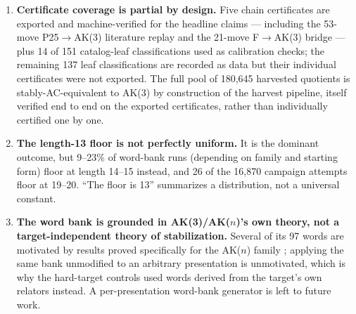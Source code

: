 \begin{enumerate}
  \item \textbf{Certificate coverage is partial by design.} Five chain certificates are
    exported and machine-verified for the headline claims --- including the 53-move
    P25$\to$AK(3) literature replay and the 21-move F$\to$AK(3) bridge --- plus 14 of 151
    catalog-leaf classifications used as calibration checks; the remaining 137 leaf
    classifications are recorded as data but their individual certificates were not
    exported. The full pool of 180,645 harvested quotients is stably-AC-equivalent to AK(3)
    by construction of the harvest pipeline, itself verified end to end on the exported
    certificates, rather than individually certified one by one.

  \item \textbf{The length-13 floor is not perfectly uniform.} It is the dominant outcome,
    but 9--23\% of word-bank runs (depending on family and starting form) floor at length
    14--15 instead, and 26 of the 16,870 campaign attempts floor at 19--20. ``The floor is
    13'' summarizes a distribution, not a universal constant.

  \item \textbf{The word bank is grounded in AK(3)/AK($n$)'s own theory, not a
    target-independent theory of stabilization.} Several of its 97 words are motivated by
    results proved specifically for the AK($n$) family \cite{shehper2024hard}; applying the
    same bank unmodified to an arbitrary presentation is unmotivated, which is why the
    hard-target controls used words derived from the target's own relators instead. A
    per-presentation word-bank generator is left to future work.
\end{enumerate}
